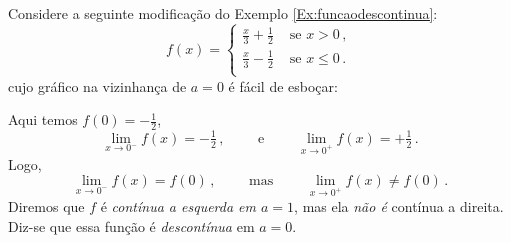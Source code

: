 \begin{ex}
Considere a seguinte modificação do Exemplo \ref{Ex:funcaodescontinua}:
\[ f(x)=
\begin{cases}
\tfrac{x}{3}+\tfrac12&\text{ se }x>0\,,\\
\tfrac{x}{3}-\tfrac12&\text{ se }x\leq 0\,.\\
\end{cases}
\]
cujo gráfico na vizinhança de $a=0$ é fácil de esboçar:
\begin{center}
\begin{bmlimage}\end{bmlimage}
\end{center}
Aqui temos $f(0)=-\tfrac12$, 
$$
\lim_{x\to 0^-}f(x)=
-\tfrac12\,,\quad \quad 
\text{ e }
\quad
\quad
\lim_{x\to 0^+}f(x)=
+\tfrac12\,.
$$
Logo,
\[ 
\lim_{x\to 0^-}f(x)=f(0)\,,\quad \quad 
\text{ mas }
\quad
\quad
\lim_{x\to 0^+}f(x)\neq f(0)\,.
\]
Diremos que $f$ é \emph{contínua a esquerda em $a=1$}, mas ela \emph{não é}
contínua a direita.
Diz-se que essa função é \emph{descontínua} em $a=0$.
\end{ex}


